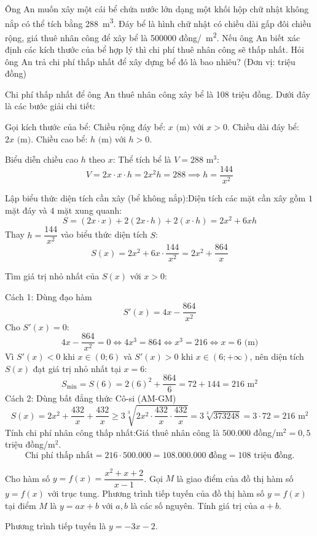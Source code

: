 \begin{baitap}
	Ông An muốn xây một cái bể chứa nước lớn dạng một khối hộp chữ nhật không nắp có thể tích bằng \SI{288}{\cubic\meter}. Đáy bể là hình chữ nhật có chiều dài gấp đôi chiều rộng, giá thuê nhân công để xây bể là \num{500000} đồng/\SI{}{\square\meter}. Nếu ông An biết xác định các kích thước của bể hợp lý thì chi phí thuê nhân công sẽ thấp nhất. Hỏi ông An trả chi phí thấp nhất để xây dựng bể đó là bao nhiêu? (Đơn vị: triệu đồng)
	\begin{traloi}
		
		Chi phí thấp nhất để ông An thuê nhân công xây bể là 108 triệu đồng. Dưới đây là các bước giải chi tiết:
		
		Gọi kích thước của bể: Chiều rộng đáy bể: $x \text{ (m)}$ với $x > 0$. Chiều dài đáy bể: $2x \text{ (m)}$. Chiều cao bể: $h \text{ (m)}$ với $h > 0$. 
		
		Biểu diễn chiều cao $h$ theo $x$: Thể tích bể là $V = 288\text{ m}^3$:$$V = 2x \cdot x \cdot h = 2x^2 h = 288 \implies h = \dfrac{144}{x^2}$$
		
		Lập biểu thức diện tích cần xây (bể không nắp):Diện tích các mặt cần xây gồm $1$ mặt đáy và $4$ mặt xung quanh:$$S = (2x \cdot x) + 2(2x \cdot h) + 2(x \cdot h) = 2x^2 + 6xh$$Thay $h = \dfrac{144}{x^2}$ vào biểu thức diện tích $S$:$$S(x) = 2x^2 + 6x \cdot \dfrac{144}{x^2} = 2x^2 + \dfrac{864}{x}$$
		
		Tìm giá trị nhỏ nhất của $S(x)$ với $x > 0$:
		
		Cách 1: Dùng đạo hàm$$S'(x) = 4x - \dfrac{864}{x^2}$$Cho $S'(x) = 0$:$$4x - \dfrac{864}{x^2} = 0 \iff 4x^3 = 864 \iff x^3 = 216 \iff x = 6\text{ (m)}$$Vì $S'(x) < 0$ khi $x \in (0; 6)$ và $S'(x) > 0$ khi $x \in (6; +\infty)$, nên diện tích $S(x)$ đạt giá trị nhỏ nhất tại $x = 6$:$$S_{\min} = S(6) = 2(6)^2 + \dfrac{864}{6} = 72 + 144 = 216\text{ m}^2$$
		Cách 2: Dùng bất đẳng thức Cô-si (AM-GM)$$S(x) = 2x^2 + \dfrac{432}{x} + \dfrac{432}{x} \ge 3 \sqrt[3]{2x^2 \cdot \dfrac{432}{x} \cdot \dfrac{432}{x}} = 3 \sqrt[3]{373248} = 3 \cdot 72 = 216\text{ m}^2$$Tính chi phí nhân công thấp nhất:Giá thuê nhân công là $500.000$ đồng/$\text{m}^2 = 0{,}5$ triệu đồng/$\text{m}^2$.$$\text{Chi phí thấp nhất} = 216 \cdot 500.000 = 108.000.000\text{ đồng} = 108\text{ triệu đồng}.$$
	\end{traloi}
\end{baitap}

\begin{baitap}
	Cho hàm số $y = f(x) = \dfrac{x^2 + x + 2}{x - 1}$. Gọi $M$ là giao điểm của đồ thị hàm số $y = f(x)$ với trục tung. Phương trình tiếp tuyến của đồ thị hàm số $y = f(x)$ tại điểm $M$ là $y = ax +b$ với $ a,b $ là các số nguyên. Tính giá trị của $ a+b.$
	\begin{traloi}
		\dapan{-5}
		
		Phương trình tiếp tuyến là $ y=-3x-2 $.
	\end{traloi}
\end{baitap}
